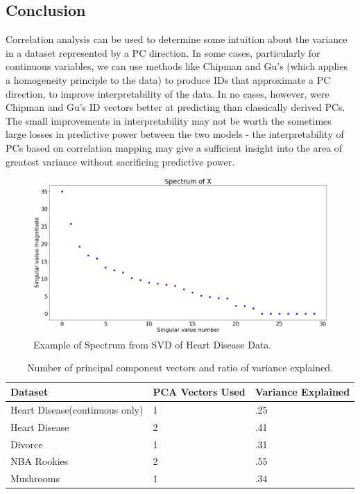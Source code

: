 \documentclass{article}
\begin{document}
{\subsection{Conclusion}{
Correlation analysis can be used to determine some intuition about the variance in a dataset represented by a PC direction. In some cases, particularly for continuous variables, we can use methods like Chipman and Gu’s (which applies a homogeneity principle to the data) to produce IDs that approximate a PC direction, to improve interpretability of the data. In no cases, however, were Chipman and Gu’s ID vectors better at predicting than classically derived PCs. The small improvements in interpretability may not be worth the sometimes large losses in predictive power between the two models - the interpretability of PCs based on correlation mapping may give a sufficient insight into the area of greatest variance without sacrificing predictive power.} 
}

\begin{figure}
	\includegraphics[width=\linewidth]{spectrumHD.png}
	\caption{Example of Spectrum from SVD of Heart Disease Data.}
\end{figure}


\begin{table}
  \caption{Number of principal component vectors and ratio of variance explained.}
  \centering
  \begin{tabular}{lll}
    \toprule
    \midrule
    Dataset     & PCA Vectors Used       & Variance Explained \\
    \midrule
    \midrule
    Heart Disease(continuous only) & 1 & .25     \\
    \midrule
    Heart Disease & 2 & .41     \\
    \midrule
    Divorce     & 1 & .31    \\
    \midrule
    NBA Rookies     & 2   & .55 \\
    \midrule
    Mushrooms     & 1   & .34 \\
    \bottomrule
  \end{tabular}
\end{table}
\end{document}
